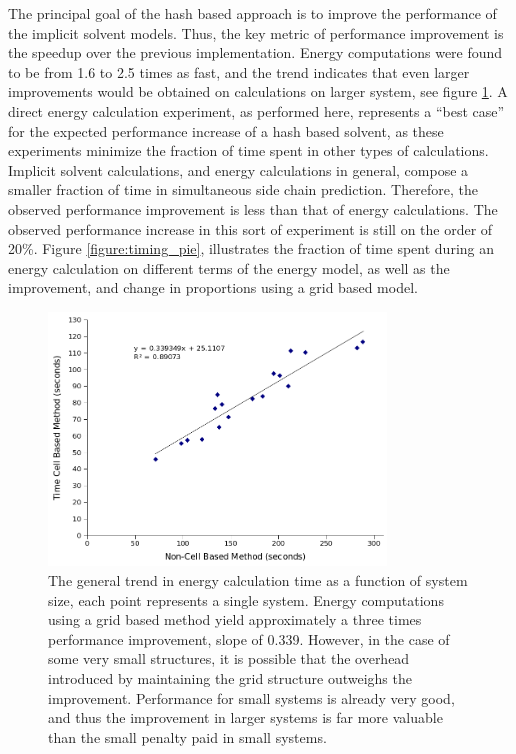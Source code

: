 The principal goal of the hash based approach is to improve the performance of the implicit solvent models. 
Thus, the key metric of performance improvement is the speedup over the previous implementation.
Energy computations were found to be from 1.6 to 2.5 times as fast, and the trend indicates that even larger improvements would be obtained on calculations on larger system, see figure \ref{figure:grid_based_performance}.
A direct energy calculation experiment, as performed here, represents a ``best case'' for the expected performance increase of a hash based solvent, as these experiments minimize the fraction of time spent in other types of calculations.
Implicit solvent calculations, and energy calculations in general, compose a smaller fraction of time in simultaneous side chain prediction.
Therefore, the observed performance improvement is less than that of energy calculations.
The observed performance increase in this sort of experiment is still on the order of 20\%.
Figure \ref{figure:timing_pie}, illustrates the fraction of time spent during an energy calculation on different terms of the energy model, as well as the improvement, and change in proportions using a grid based model.
                                                                      
\begin{figure}[H]
\centering
\includegraphics[width=0.8\textwidth]{figures/energy_calculation_timings.png}
\caption{The general trend in energy calculation time as a function of system size, each point represents a single system.
Energy computations using a grid based method yield approximately a three times performance improvement, slope of 0.339.
However, in the case of some very small structures, it is possible that the overhead introduced by maintaining the grid structure outweighs the improvement.
Performance for small systems is already very good, and thus the improvement in larger systems is far more valuable than the small penalty paid in small systems.}
\label{figure:grid_based_performance}
\end{figure}


